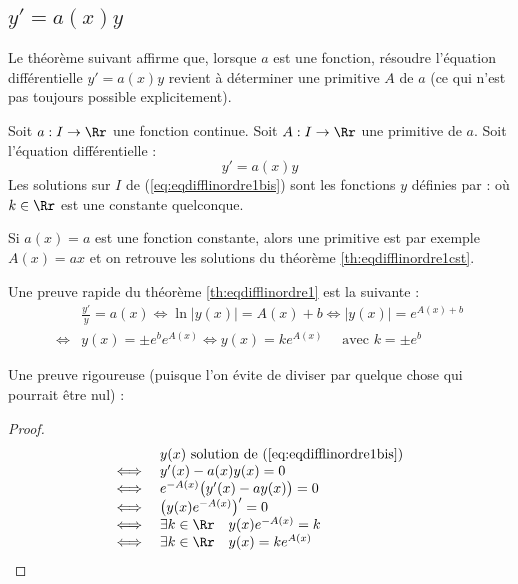 \documentclass[class=report,crop=false]{standalone}
\begin{document}
\subsection{$y'=a(x)y$}

Le théorème suivant affirme que, lorsque $a$ est une fonction,
résoudre l'équation différentielle $y'=a(x)y$
revient à déterminer une primitive $A$ de $a$ (ce qui n'est pas toujours possible explicitement).



\begin{theoreme}
\label{th:eqdifflinordre1}
Soit $a : I \to \Rr$ une fonction continue. Soit $A : I \to \Rr$ une primitive de $a$.
Soit l'équation différentielle :
\begin{equation}
   y' = a(x) y
  \label{eq:eqdifflinordre1bis}
  \tag{$E$}
\end{equation}
Les solutions sur $I$ de (\ref{eq:eqdifflinordre1bis}) sont les fonctions $y$ définies par :
où $k\in \Rr$ est une constante quelconque.
\end{theoreme}

Si $a(x)=a$ est une fonction constante, alors une primitive est par exemple $A(x)=ax$ et on retrouve
les solutions du théorème \ref{th:eqdifflinordre1cst}.


Une preuve rapide du théorème \ref{th:eqdifflinordre1} est la suivante :
\begin{eqnarray*}
&\frac{y'}{y} =  a(x)
\iff \ln |y(x)| = A(x) + b
\iff |y(x)| = e^{A(x)+b} \\
\iff& y(x) = \pm e^b e^{A(x)}
\iff y(x) = k e^{A(x)} \quad \text{ avec } k = \pm e^b
\end{eqnarray*}


Une preuve rigoureuse (puisque l'on évite de diviser
par quelque chose qui pourrait être nul) :
\begin{proof}
$$\begin{array}{rl}
     & y(x) \text{ solution de (\ref{eq:eqdifflinordre1bis}) } \\
\iff & y'(x) - a(x)y(x) = 0 \\
\iff & e^{-A(x)}\big(y'(x)-ay(x)\big) = 0 \\
\iff & \big( y(x) e^{-A(x)}\big)' = 0 \\
\iff & \exists k \in \Rr \quad y(x) e^{-A(x)} = k \\
\iff & \exists k \in \Rr \quad y(x) = ke^{A(x)}\\
\end{array}$$
\end{proof}
\end{document}
